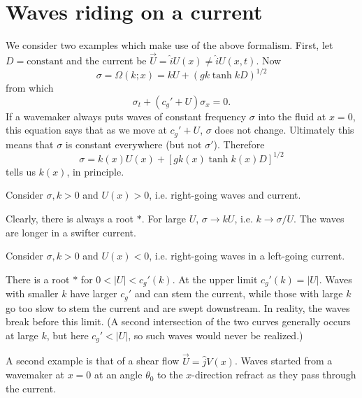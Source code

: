 \sourcepagebreak

\section{Waves riding on a current}

We consider two examples which make use of the above formalism. First, let
$D=\text{constant}$ and the current be $\vec U=\hat iU(x)\ne\hat iU(x,t)$. Now
\[
	\sigma=\Omega(k;x)=kU+(gk\tanh kD)^{1/2}
\]
from which
\[
	\sigma_t+(c_g'+U)\sigma_x=0.
\]
If a wavemaker always puts waves of constant frequency $\sigma$ into the fluid at $x=0$, this
equation says that as we move at $c_g'+U$, $\sigma$ does not change. Ultimately this means
that $\sigma$ is constant everywhere (but not $\sigma'$). Therefore
\[
	\sigma=k(x)U(x)+[gk(x)\tanh k(x)D]^{1/2}
\]
tells us $k(x)$, in principle.

Consider $\sigma,k>0$ and $U(x)>0$, i.e. right-going waves and current.


Clearly, there is always a root $*$. For large $U$, $\sigma\to kU$, i.e. $k\to\sigma/U$. The waves are
longer in a swifter current.

\sourcepagebreak

Consider $\sigma,k>0$ and $U(x)<0$, i.e. right-going waves in a left-going current.


There is a root $*$ for $0<|U|<c_g'(k)$. At the upper limit $c_g'(k)=|U|$. Waves with
smaller $k$ have larger $c_g'$ and can stem the current, while those with large $k$ go too slow
to stem the current and are swept downstream. In reality, the waves break before this
limit. (A second intersection of the two curves generally occurs at large $k$, but here
$c_g'<|U|$, so such waves would never be realized.)

A second example is that of a shear flow $\vec U=\hat jV(x)$. Waves started from a
wavemaker at $x=0$ at an angle $\theta_0$ to the $x$-direction refract as they pass through the
current.

